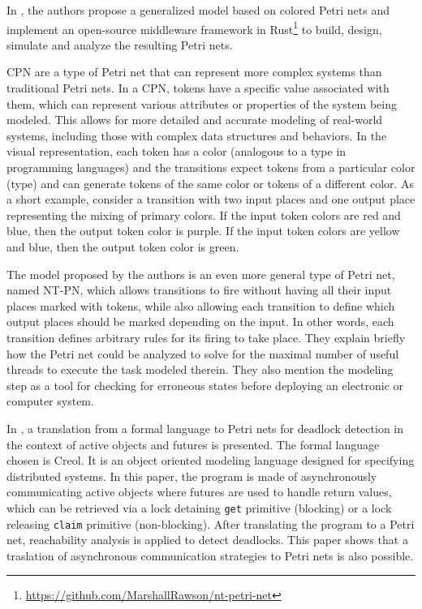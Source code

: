 \documentclass[../Thesis.tex]{subfiles}
\begin{document}
In \cite{rawson2022petri}, the authors propose a generalized model
based on colored Petri nets and implement an open-source middleware framework
in Rust\footnote{\url{https://github.com/MarshallRawson/nt-petri-net}}
to build, design, simulate and analyze the resulting Petri nets.

\acrfull{CPN} are a type of Petri net that can represent
more complex systems than traditional Petri nets.
In a CPN, tokens have a specific value associated with them,
which can represent various attributes or properties of the system being modeled.
This allows for more detailed and accurate modeling of real-world systems,
including those with complex data structures and behaviors.
In the visual representation, each token has a color
(analogous to a type in programming languages)
and the transitions expect tokens from a particular
color (type) and can generate tokens
of the same color or tokens of a different color.
As a short example, consider a transition
with two input places and one output place
representing the mixing of primary colors.
If the input token colors are red and blue, then the output token color is purple.
If the input token colors are yellow and blue, then the output token color is green.

The model proposed by the authors is an even more general type of Petri net,
named \acrfull{NT-PN}, which allows transitions to fire
without having all their input places marked with tokens,
while also allowing each transition to define
which output places should be marked depending on the input.
In other words, each transition defines arbitrary rules for its firing to take place.
They explain briefly how the Petri net could be analyzed
to solve for the maximal number of useful threads to execute the task modeled therein.
They also mention the modeling step as a tool for checking for erroneous states
before deploying an electronic or computer system.

In \cite{deboer2013petri}, a translation from a formal language to Petri nets
for deadlock detection in the context of active objects and futures is presented.
The formal language chosen is \acrfull{Creol}.
It is an object oriented modeling language designed for specifying distributed systems.
In this paper, the program is made of asynchronously communicating active objects
where futures are used to handle return values,
which can be retrieved via a lock detaining \texttt{get} primitive (blocking)
or a lock releasing \texttt{claim} primitive (non-blocking).
After translating the program to a Petri net,
reachability analysis is applied to detect deadlocks.
This paper shows that a traslation of asynchronous communication strategies to
Petri nets is also possible.
\end{document}
